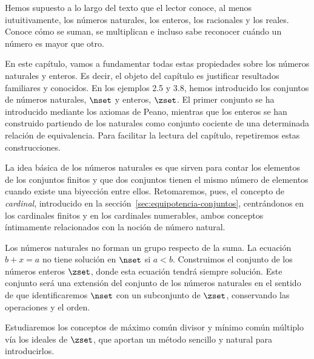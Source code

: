


Hemos supuesto a lo largo del texto que el lector conoce, al menos
iutuitivamente, los números naturales, los enteros, los racionales y los
reales. Conoce cómo se suman, se multiplican e incluso sabe reconocer cuándo
un número es mayor que otro.

En este capítulo, vamos a fundamentar todas estas propiedades sobre los
números naturales y enteros. Es decir, el objeto del capítulo es justificar
resultados familiares y conocidos. En los ejemplos 2.5 y 3.8, hemos
introducido los conjuntos de números naturales, $\nset$ y enteros, $\zset$.
El primer conjunto se ha introducido mediante los axiomas de Peano, mientras
que los enteros se han construido partiendo de los naturales como conjunto
cociente de una determinada relación de equivalencia. Para facilitar la
lectura del capítulo, repetiremos estas construcciones.

La idea básica de los números naturales es que sirven para contar los
elementos de los conjuntos finitos y que dos conjuntos tienen el mismo
número de elementos cuando existe una biyección entre ellos. Retomaremos,
pues, el concepto de \emph{cardinal}, introducido en la
sección~\ref{sec:equipotencia-conjuntos}, centrándonos en los cardinales
finitos y en los cardinales numerables, ambos conceptos íntimamente
relacionados con la noción de número natural.

Los números naturales no forman un grupo respecto de la suma. La ecuación $b
+ x = a$ no tiene solución en $\nset$ si $a < b$. Construimos el conjunto de
los números enteros $\zset$, donde esta ecuación tendrá siempre solución.
Este conjunto será una extensión del conjunto de los números naturales en el
sentido de que identificaremos $\nset$ con un subconjunto de $\zset$,
conservando las operaciones y el orden.

Estudiaremos los conceptos de máximo común divisor y mínimo común múltiplo
vía los ideales de $\zset$, que aportan un método sencillo y natural para
introducirlos.

















